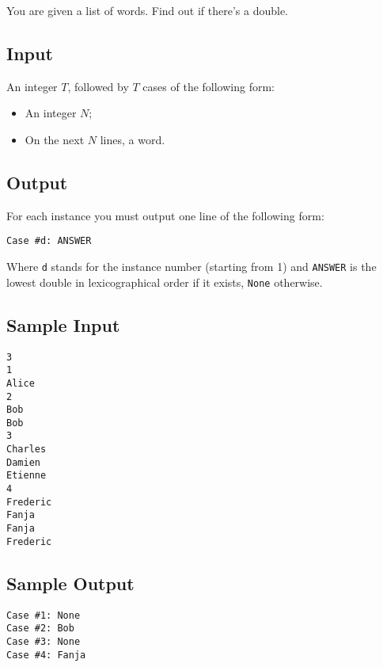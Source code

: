 

You are given a list of words. Find out if there's a double.

\subsection*{Input}

An integer $T$, followed by $T$ cases of the following form:
\begin{itemize}
\item An integer $N$;
\item On the next $N$ lines, a word.
\end{itemize}

\subsection*{Output}

For each instance you must output one line of the following form:

\begin{verbatim}
Case #d: ANSWER
\end{verbatim}

Where \texttt{d} stands for the instance number (starting from 1) and \texttt{ANSWER} is the lowest double in lexicographical order if it exists, \texttt{None} otherwise.

\subsection*{Sample Input}

\begin{verbatim}
3
1
Alice
2
Bob
Bob
3
Charles
Damien
Etienne
4
Frederic
Fanja
Fanja
Frederic
\end{verbatim}

\subsection*{Sample Output}

\begin{verbatim}
Case #1: None
Case #2: Bob
Case #3: None
Case #4: Fanja
\end{verbatim}
